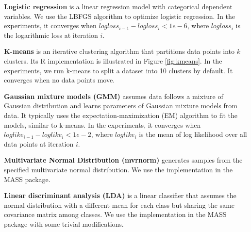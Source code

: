 \noindent \textbf{Logistic regression} is a linear regression model with
categorical dependent variables. We use the LBFGS algorithm \cite{lbfgs}
to optimize logistic regression. In the experiments, it converges when
$logloss_{i-1}-logloss_i < 1e-6$, where $logloss_i$ is the logarithmic loss
at iteration $i$.

\noindent \textbf{K-means} is an iterative clustering algorithm that
partitions data points into $k$ clusters. Its R implementation is illustrated
in Figure \ref{fig:kmeans}. In the experiments, we run k-means to split
a dataset into 10 clusters by default. It converges when no data points
move.

\noindent \textbf{Gaussian mixture models (GMM)} assumes data follows
a mixture of Gaussian distribution and learns parameters of Gaussian mixture
models from data. It typically uses the expectation-maximization (EM)
algorithm \cite{em} to fit the models, similar to k-means. In the experiments,
it converges when $loglike_{i-1} - loglike_i < 1e-2$, where $loglike_i$
is the mean of log likelihood over all data points at iteration $i$.

\noindent \textbf{Multivariate Normal Distribution (mvrnorm)} generates
samples from the specified multivariate normal distribution. We use
the implementation in the MASS package.

\noindent \textbf{Linear discriminant analysis (LDA)} is a linear classifier
that assumes the normal distribution with a different mean for each class
but sharing the same covariance matrix among classes. We use the implementation
in the MASS package with some trivial modifications.

